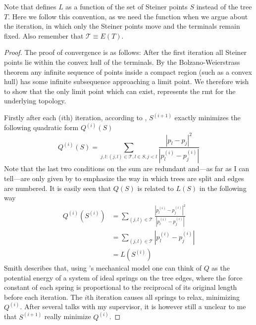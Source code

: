 Note that \textcite{smith1992} defines $L$ as a function of the set of
Steiner points $S$ instead of the tree $T$. Here we follow this
convention, as we need the function when we argue about the iteration, in which
only the Steiner points move and the terminals remain fixed. Also remember
that $\mathcal{T} \equiv E(T)$.

\begin{proof}
The proof of convergence is as follows: After the first iteration all Steiner
points lie within the convex hull of the terminals. By the Bolzano-Weierstrass
theorem any infinite sequence of points inside a compact region (such as a
convex hull) has some infinite subsequence approaching a limit point. We
therefore wish to show that the only limit point which can exist, represents
the \ac{rmt} for the underlying topology.

Firstly after each ($i$th) iteration, according to \textcite{smith1992},
$S^{(i+1)}$ exactly minimizes the following quadratic form $Q^{(i)}(S)$
%
\begin{equation}
  Q^{(i)}(S) = \sum_{j,l : (j,l) \in \mathcal{T}, l \in S, j < l }
  \frac{|p_l - p_j|^2}{|p^{(i)}_l - p^{(i)}_j|}
\end{equation}
%
Note that the last two conditions on the sum are redundant and---as far as I can
tell---are only given by \citeauthor{smith1992} to emphasize the way in which
trees are split and edges are numbered. It is easily seen that $Q(S)$ is related to
$L(S)$ in the following way
%
\begin{align}
  Q^{(i)}(S^{(i)})
  &= \sum_{(j,l) \in \mathcal{T}}
    \frac{|p^{(i)}_l - p^{(i)}_j|^2}{|p^{(i)}_l - p^{(i)}_j|} \\
  &= \sum_{(j,l) \in \mathcal{T}} |p^{(i)}_l - p^{(i)}_j| \\
  &= L(S^{(i)}) \label{eq:24}
\end{align}
%
Smith describes that, using \textcite{gilbert1968}'s mechanical model one can
think of $Q$ as the potential energy of a system of ideal springs on the tree
edges, where the force constant of each spring is proportional to the reciprocal
of its original length before each iteration. The $i$th iteration causes all
springs to relax, minimizing $Q^{(i)}$. After several talks with my supervisor,
it is however still a unclear to me that $S^{(i+1)}$ really minimize $Q^{(i)}$.


\end{proof}
